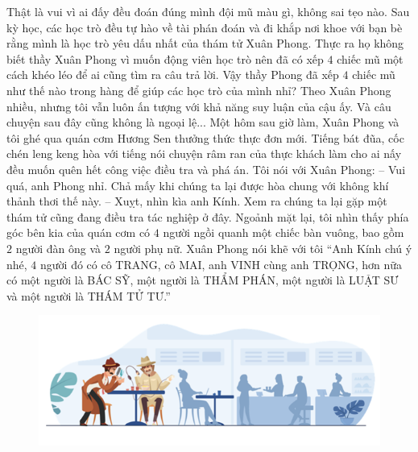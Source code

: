 	\vskip 0.1cm
	Thật là vui vì ai đấy đều đoán đúng mình đội mũ màu gì, không sai tẹo nào. Sau kỳ học, các học trò đều tự hào về tài phán đoán và đi khắp nơi khoe với bạn bè rằng mình là học trò yêu dấu nhất của thám tử Xuân Phong. Thực ra họ không biết thầy Xuân Phong vì muốn động viên học trò nên đã có xếp $4$ chiếc mũ một cách khéo léo để ai cũng tìm ra câu trả lời. 
	\vskip 0.1cm
	Vậy thầy Phong đã xếp $4$ chiếc mũ như thế nào trong hàng để giúp các học trò của mình nhỉ? 
	\vskip 0.1cm
	Theo Xuân Phong nhiều, nhưng tôi vẫn luôn ấn tượng với khả năng suy luận của cậu ấy. Và câu chuyện sau đây cũng không là ngoại lệ...
	\vskip 0.1cm
	{\color{toanhocdoisong}{VỊ THÁM TỬ ẨN DANH}}
	\vskip 0.1cm
	Một hôm sau giờ làm, Xuân Phong và tôi ghé qua quán cơm Hương Sen thưởng thức thực đơn mới. Tiếng bát đũa, cốc chén leng keng hòa với tiếng nói chuyện râm ran của thực khách làm cho ai nấy đều muốn quên hết công việc điều tra và phá án. 
	\vskip 0.1cm
	Tôi nói với Xuân Phong: 
	\vskip 0.1cm
	-- Vui quá, anh Phong nhỉ. Chả mấy khi chúng ta lại được hòa chung với không khí thảnh thơi thế này. 
	\vskip 0.1cm
	-- Xuỵt, nhìn kìa anh Kính. Xem ra chúng ta lại gặp một thám tử cũng đang điều tra tác nghiệp ở đây. 
	\vskip 0.1cm
	Ngoảnh mặt lại, tôi nhìn thấy phía góc bên kia của quán cơm có $4$ người ngồi quanh một chiếc bàn vuông, bao gồm $2$ người đàn ông và $2$ người phụ nữ. Xuân Phong nói khẽ với tôi “Anh Kính chú ý nhé, $4$ người đó có cô TRANG, cô MAI, anh VINH cùng anh TRỌNG, hơn nữa có một người là BÁC SỸ, một người là THẨM PHÁN, một người là LUẬT SƯ và một người là THÁM TỬ TƯ.” 
	\begin{figure}[H]
			\centering
			\vspace*{-5pt}
			\captionsetup{labelformat= empty, justification=centering}
			\includegraphics[width=1\linewidth]{4}
			\vspace*{-15pt}
		\end{figure}
